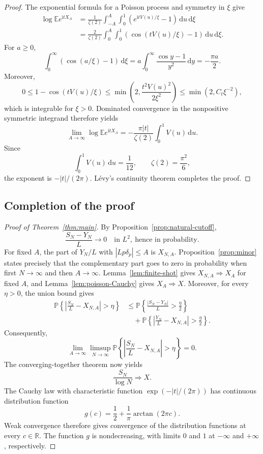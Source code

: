 \documentclass[11pt]{article}
\numberwithin{equation}{section}
\theoremstyle{definition}
\newcommand{\R}{\mathbb R}
\newcommand{\E}{\mathbb E}
\newcommand{\Pp}{\mathbb P}
\newcommand{\1}{\mathbf 1}
\newcommand{\ii}{\mathrm i}
\newcommand{\dd}{\,\mathrm d}
\begin{document}
\begin{proof}
The exponential formula for a Poisson process and symmetry in \(\xi\)
give
\begin{align*}
 \log\E e^{\ii tX_A}
 &=
 \frac1{\zeta(2)}
 \int_{-A}^{A}\int_0^1
 \left(e^{\ii tV(u)/\xi}-1\right)\dd u\dd\xi\\
 &=
 \frac2{\zeta(2)}
 \int_0^A\int_0^1
 \left(\cos(tV(u)/\xi)-1\right)\dd u\dd\xi.
\end{align*}
For \(a\ge0\),
\[
 \int_0^\infty\left(\cos(a/\xi)-1\right)\dd\xi
 =
 a\int_0^\infty\frac{\cos y-1}{y^2}\dd y
 =-\frac{\pi a}{2}.
\]
Moreover,
\[
 0\le1-\cos(tV(u)/\xi)
 \le\min\!\left(2,\frac{t^2V(u)^2}{2\xi^2}\right)
 \le\min(2,C_t\xi^{-2}),
\]
which is integrable for \(\xi>0\).  Dominated convergence in the
nonpositive symmetric integrand therefore yields
\[
 \lim_{A\to\infty}\log\E e^{\ii tX_A}
 =
 -\frac{\pi|t|}{\zeta(2)}\int_0^1V(u)\dd u.
\]
Since
\[
 \int_0^1V(u)\dd u=\frac1{12},\qquad
 \zeta(2)=\frac{\pi^2}{6},
\]
the exponent is \(-|t|/(2\pi)\).  L\'evy's continuity theorem
completes the proof.
\end{proof}

\subsection{Completion of the proof}

\begin{proof}[Proof of Theorem~\ref{thm:main}]
By Proposition~\ref{prop:natural-cutoff},
\[
 \frac{S_N-Y_N}{L}\longrightarrow0
 \quad\text{in }L^2,\ \text{hence in probability}.
\]
For fixed \(A\), the part of \(Y_N/L\) with
\(|Lp\delta_p|\le A\) is \(X_{N,A}\).  Proposition~\ref{prop:minor}
states precisely that the complementary part goes to zero in probability
when first \(N\to\infty\) and then \(A\to\infty\).
Lemma~\ref{lem:finite-shot} gives
\(X_{N,A}\Rightarrow X_A\) for fixed \(A\), and
Lemma~\ref{lem:poisson-Cauchy} gives \(X_A\Rightarrow X\).
Moreover, for every \(\eta>0\), the union bound gives
\begin{align*}
 \Pp\left\{\left|\frac{S_N}{L}-X_{N,A}\right|>\eta\right\}
 &\le
 \Pp\left\{\frac{|S_N-Y_N|}{L}>\frac\eta2\right\}\\
 &\quad+
 \Pp\left\{\left|\frac{Y_N}{L}-X_{N,A}\right|>\frac\eta2\right\}.
\end{align*}
Consequently,
\[
 \lim_{A\to\infty}\limsup_{N\to\infty}
 \Pp\left\{\left|\frac{S_N}{L}-X_{N,A}\right|>\eta\right\}=0.
\]
The converging-together theorem \cite[Theorem~3.2]{Billingsley} now yields
\[
 \frac{S_N}{\log N}\Longrightarrow X.
\]
The Cauchy law with characteristic function
\(\exp(-|t|/(2\pi))\) has continuous distribution function
\[
 g(c)=\frac12+\frac1\pi\arctan(2\pi c).
\]
Weak convergence therefore gives convergence of the distribution
functions at every \(c\in\R\).  The function \(g\) is nondecreasing,
with limits \(0\) and \(1\) at \(-\infty\) and \(+\infty\),
respectively.
\end{proof}
\end{document}
